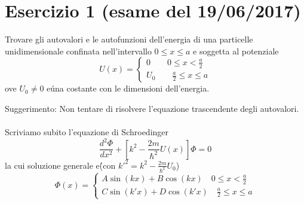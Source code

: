 \documentclass[a4paper]{article}
\begin{document}
    \section*{Esercizio 1 (esame del 19/06/2017)}
        Trovare gli autovalori e le autofunzioni dell'energia di una particelle unidimensionale confinata nell'intervallo $0\leq x\leq a$ e soggetta al potenziale
        \begin{equation*}
            U(x)=
            \begin{cases}
                0\quad\quad 0\leq x <\frac{a}{2}\\
                U_0\quad\quad \frac{a}{2}\leq x \leq a
            \end{cases}
        \end{equation*}
        ove $U_0\neq 0$ e\' una costante con le dimensioni dell'energia.
        \begin{figure}[H]
            \centering
        \end{figure}
        Suggerimento: Non tentare di risolvere l'equazione trascendente degli autovalori.
        \\
        \\
        Scriviamo subito l'equazione di Schroedinger
        \begin{equation*}
            \frac{d^2\Phi}{dx^2}+\left[k^2-\frac{2m}{\hbar^2}U(x)\right]\Phi=0
        \end{equation*}
        la cui soluzione generale e\' (con $k'^2=k^2-\frac{2m}{\hbar^2}U_0$)
        \begin{equation*}
            \Phi(x)=
            \begin{cases}
                A\sin(kx)+B\cos(kx)\quad 0\leq x <\frac{a}{2}\\
                C\sin(k'x)+D\cos(k'x)\quad \frac{a}{2}\leq x \leq a
            \end{cases}
        \end{equation*}
\end{document}
